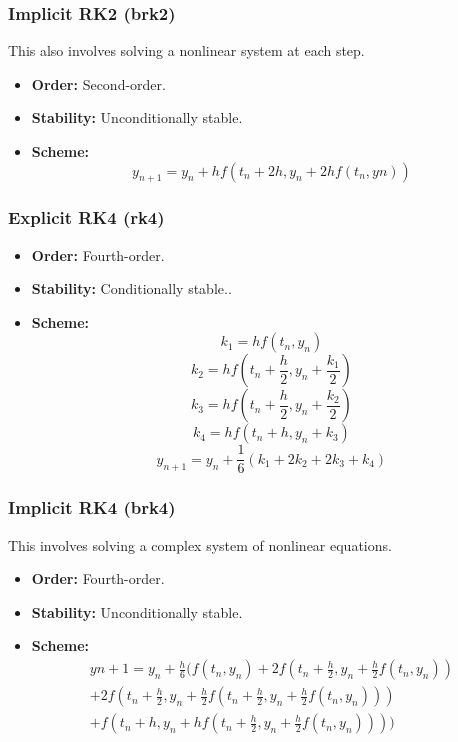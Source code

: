 \documentclass[a4paper,12pt,french]{article}
\begin{document}
\subsubsection{Implicit RK2 (brk2)}
This also involves solving a nonlinear system at each step.
\begin{itemize}
    \item \textbf{Order:} Second-order.
    \item \textbf{Stability:} Unconditionally stable.
    \item \textbf{Scheme:} \begin{equation}
        y_{n+1}=y_n+hf(t_n+2h,y_n+2hf(t_n,yn))
    \end{equation}
\end{itemize}

\subsubsection{Explicit RK4 (rk4)}
\begin{itemize}
    \item \textbf{Order:} Fourth-order.
    \item \textbf{Stability:} Conditionally stable..
    \item \textbf{Scheme:}
        \begin{equation*}
            k_1=hf(t_n,y_n)
        \end{equation*}
        \begin{equation*}
            k_2=hf(t_n+\frac{h}{2},y_n+\frac{k_1}{2})
        \end{equation*}
        \begin{equation*}
            k_3=hf(t_n+\frac{h}{2},y_n+\frac{k_2}{2})
        \end{equation*}
        \begin{equation*}
            k_4=hf(t_n+h,y_n+k_3)
        \end{equation*}
        \begin{equation}
            y_{n+1}=y_n+\frac{1}{6}(k_1+2k_2+2k_3+k_4)
        \end{equation}

\end{itemize}

\subsubsection{Implicit RK4 (brk4)}
This involves solving a complex system of nonlinear equations.
\begin{itemize}
    \item \textbf{Order:} Fourth-order.
    \item \textbf{Stability:} Unconditionally stable.
    \item \textbf{Scheme:} \begin{multline}
        y{n+1}=y_n+\frac{h}{6}(f(t_n,y_n)+2f(t_n+\frac{h}{2},y_n+\frac{h}{2}f(t_n,y_n)) \\ +2f(t_n+\frac{h}{2},y_n+\frac{h}{2}f(t_n+\frac{h}{2},y_n+\frac{h}{2}f(t_n,y_n))) \\ +f(t_n+h,y_n+hf(t_n+\frac{h}{2},y_n+\frac{h}{2}f(t_n,y_n))))
    \end{multline}
\end{itemize}
\end{document}
